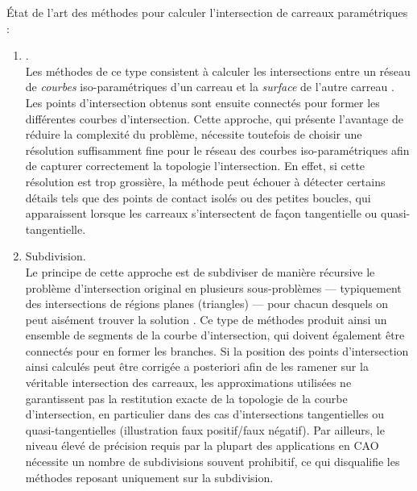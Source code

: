 État de l'art des méthodes pour calculer l'intersection de carreaux paramétriques :
\begin{enumerate}
	\item {}.\\
	Les méthodes de ce type consistent à calculer les intersections entre un réseau de \textit{courbes} iso-paramétriques d'un carreau et la \textit{surface} de l'autre carreau \cite{rossignac1987}. 
	Les points d'intersection obtenus sont ensuite connectés pour former les différentes courbes d'intersection. 
	Cette approche, qui présente l'avantage de réduire la complexité du problème, nécessite toutefois de choisir une résolution suffisamment fine pour le réseau des courbes iso-paramétriques afin de capturer correctement la topologie l'intersection. 
	En effet, si cette résolution est trop grossière, la méthode peut échouer à détecter certains détails tels que des points de contact isolés ou des petites boucles, qui apparaissent lorsque les carreaux s'intersectent de façon tangentielle ou quasi-tangentielle.
	
	\item Subdivision.\\
	Le principe de cette approche est de subdiviser de manière récursive le problème d'intersection original en plusieurs sous-problèmes --- typiquement des intersections de régions planes (\eg triangles) --- pour chacun desquels on peut aisément trouver la solution \cite{houghton1985}. 
	Ce type de méthodes produit ainsi un ensemble de segments de la courbe d'intersection, qui doivent également être connectés pour en former les branches. 
	Si la position des points d'intersection ainsi calculés peut être corrigée a posteriori afin de les ramener sur la véritable intersection des carreaux, les approximations utilisées ne garantissent pas la restitution exacte de la topologie de la courbe d'intersection, en particulier dans des cas d'intersections tangentielles ou quasi-tangentielles (illustration faux positif/faux négatif).
	Par ailleurs, le niveau élevé de précision requis par la plupart des applications en CAO nécessite un nombre de subdivisions souvent prohibitif, ce qui disqualifie les méthodes reposant uniquement sur la subdivision.


\end{enumerate}
